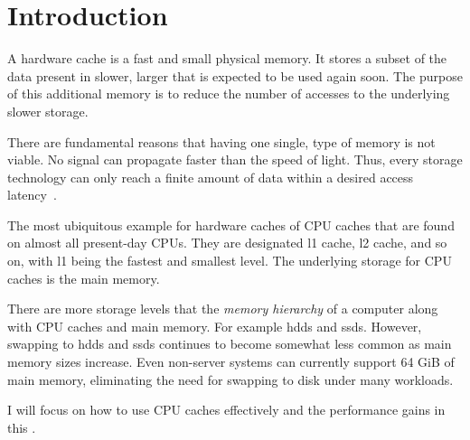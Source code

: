 \section{Introduction}

A hardware cache is a  fast and small physical memory.  It
stores a subset of the data present in slower, larger  that is
expected to be used again soon.  The purpose of this additional memory is to reduce the
number of accesses to the underlying slower storage.

There are fundamental reasons that having one single,  type of
memory is not viable.  No signal can propagate faster than the speed of light.  Thus,
every storage technology can only reach a finite amount of data within a desired access
latency~\cite[2]{afmh}.

The most ubiquitous example for hardware caches  of CPU caches that are found on almost all present-day
CPUs.  They are designated \gls{l1} cache, \gls{l2} cache, and so on, with \gls{l1} being
the fastest and smallest level.  The underlying storage for CPU caches is the main memory.

There are more storage levels that  the \emph{memory hierarchy}
of a computer along with CPU caches and main memory.  For example \glspl{hdd} and
\glspl{ssd}.
However, swapping to \glspl{hdd} and \glspl{ssd} continues to become somewhat less common
as main memory sizes increase.  Even non-server systems can currently support 64 GiB of
main memory, eliminating the need for swapping to disk under many workloads.

I will focus on how to use CPU caches effectively and the 
performance gains in this \article{}.


